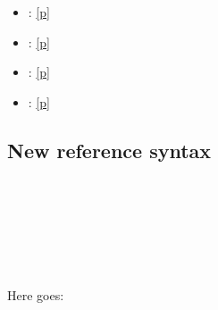 {\begin{itemize}\item{ : \hyperref[container-page-test-module-Ocamlary-indexmodules]{[p\pageref*{container-page-test-module-Ocamlary-indexmodules}]}}%
\item{ : \hyperref[container-page-test-module-Ocamlary-aliases]{[p\pageref*{container-page-test-module-Ocamlary-aliases}]}}%
\item{ : \hyperref[xref-unresolved]{[p\pageref*{xref-unresolved}]}}%
\item{ : \hyperref[container-page-test-module-Ocamlary-incl]{[p\pageref*{container-page-test-module-Ocamlary-incl}]}}\end{itemize}%
\subsection{New reference syntax\label{new-reference-syntax}}%
\label{container-page-test-module-Ocamlary-module-type-M}\begin{ocamlindent}\label{container-page-test-module-Ocamlary-module-type-M-type-t}\\
\end{ocamlindent}%
\\
\label{container-page-test-module-Ocamlary-module-M}\begin{ocamlindent}\label{container-page-test-module-Ocamlary-module-M-type-t}\\
\end{ocamlindent}%
\\
Here goes:

}
